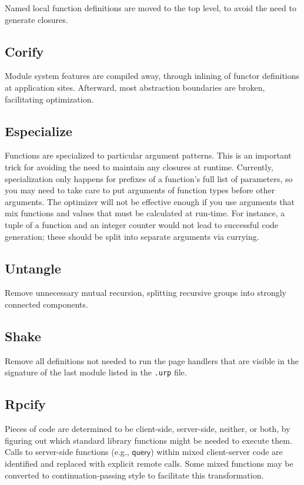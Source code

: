 \documentclass{article}
\newcommand{\mt}[1]{\mathsf{#1}}
\begin{document}
Named local function definitions are moved to the top level, to avoid the need to generate closures.

\subsection{Corify}

Module system features are compiled away, through inlining of functor definitions at application sites.  Afterward, most abstraction boundaries are broken, facilitating optimization.

\subsection{Especialize}

Functions are specialized to particular argument patterns.  This is an important trick for avoiding the need to maintain any closures at runtime.  Currently, specialization only happens for prefixes of a function's full list of parameters, so you may need to take care to put arguments of function types before other arguments.  The optimizer will not be effective enough if you use arguments that mix functions and values that must be calculated at run-time.  For instance, a tuple of a function and an integer counter would not lead to successful code generation; these should be split into separate arguments via currying.

\subsection{Untangle}

Remove unnecessary mutual recursion, splitting recursive groups into strongly connected components.

\subsection{Shake}

Remove all definitions not needed to run the page handlers that are visible in the signature of the last module listed in the \texttt{.urp} file.

\subsection{Rpcify}

Pieces of code are determined to be client-side, server-side, neither, or both, by figuring out which standard library functions might be needed to execute them.  Calls to server-side functions (e.g., $\mt{query}$) within mixed client-server code are identified and replaced with explicit remote calls.  Some mixed functions may be converted to continuation-passing style to facilitate this transformation.
\end{document}
